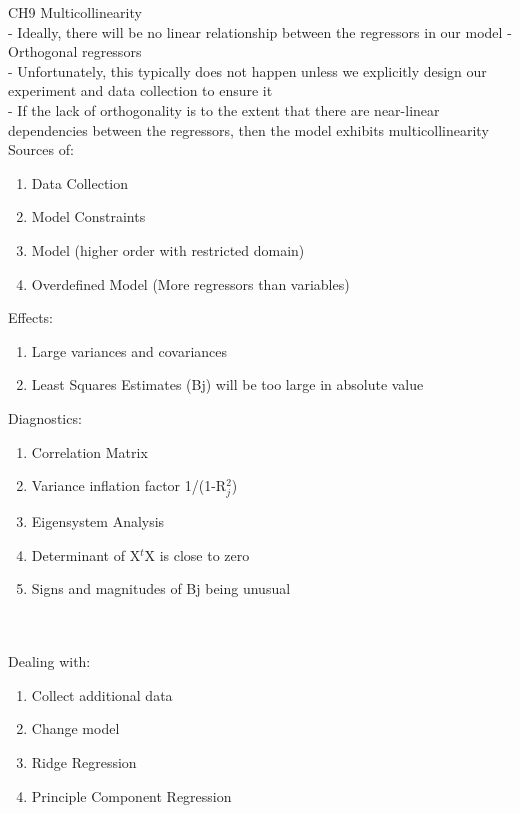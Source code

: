 \documentclass[17pt]{extarticle}%
\begin{document}
	
%


\clearpage
{\Large CH9 Multicollinearity} \\
%
- Ideally, there will be no linear relationship between the regressors in our model - Orthogonal regressors \\
- Unfortunately, this typically does not happen unless we explicitly design our experiment and data collection to ensure it \\
- If the lack of orthogonality is to the extent that there are near-linear dependencies between the regressors, then the model exhibits multicollinearity \\
Sources of:
\begin{enumerate}
\item Data Collection
\item Model Constraints
\item Model  (higher order with restricted domain)
\item Overdefined Model (More regressors than variables)
\end{enumerate}
Effects:
\begin{enumerate}
\item Large variances and covariances
\item Least Squares Estimates (Bj) will be too large in absolute value
\end{enumerate}
Diagnostics:
\begin{enumerate}
\item Correlation Matrix
\item Variance inflation factor 1/(1-R$_j^2$)
\item Eigensystem Analysis
\item Determinant of X$^t$X is close to zero
\item  Signs and magnitudes of Bj being unusual
\end{enumerate} \hspace{2em} \\ \\
Dealing with:
\begin{enumerate}
\item Collect additional data
\item Change model
\item Ridge Regression
\item Principle Component Regression
\end{enumerate}
\end{document}
